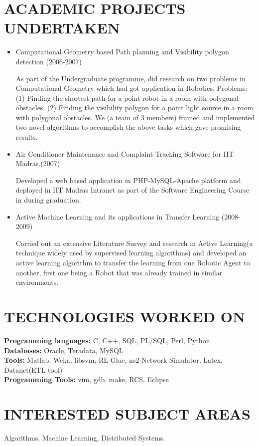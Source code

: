 \documentclass{res}
\begin{document}
\begin{resume}
\section{ACADEMIC PROJECTS UNDERTAKEN}
\begin{itemize}
\item {Computational Geometry based Path planning and Visibility polygon detection (2006-2007)}

As part of the Undergraduate programme, did research on two problems in Computational Geometry which had got application in Robotics. Problems: (1) Finding the shortest path for a point robot in a room with polygonal obstacles. (2) Finding the visibility polygon for a point light source in a room with polygonal obstacles. We (a team of 3 members) framed and implemented two novel algorithms to accomplish the above tasks which gave promising results.

\item {Air Conditioner Maintenance and Complaint Tracking Software for IIT Madras.(2007)}

Developed a web based application in PHP-MySQL-Apache platform and deployed in IIT Madras Intranet as part of the Software Engineering Course in during graduation.

\item {Active Machine Learning and its applications in Transfer Learning (2008-2009)}

Carried out an extensive Literature Survey and research in Active Learning(a technique widely used by supervised learning algorithms) and developed an active learning algorithm to transfer the learning from one Robotic Agent to another, first one being a Robot that was already trained in similar environments. 

\end{itemize}
	
\section{TECHNOLOGIES WORKED ON}
\textbf{Programming languages:} C, C++, SQL, PL/SQL, Perl, Python\\
\textbf{Databases:} Oracle, Teradata, MySQL\\
\textbf{Tools:} Matlab, Weka, libsvm, RL-Glue, ns2-Network Simulator, Latex, Datanet(ETL tool)\\
\textbf{Programming Tools:} vim, gdb, make, RCS, Eclipse

\section{INTERESTED SUBJECT AREAS}  
Algorithms, Machine Learning, Distributed Systems.
  

\end{resume}
\end{document}
